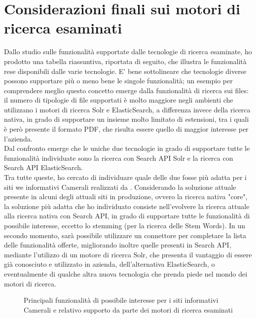 	\section{Considerazioni finali sui motori di ricerca esaminati}
	Dallo studio sulle funzionalità supportate dalle tecnologie di ricerca esaminate, ho prodotto una tabella riassuntiva, riportata di seguito, che illustra le funzionalità rese disponibili dalle varie tecnologie. E' bene sottolineare che tecnologie diverse possono supportare più o meno bene le singole funzionalità; un esempio per comprendere meglio questo concetto emerge dalla funzionalità di ricerca sui files: il numero di tipologie di file supportati è molto maggiore negli ambienti che utilizzano i motori di ricerca \gls{Solr} e \gls{ElasticSearch}, a differenza invece della ricerca nativa, in grado di supportare un insieme molto limitato di estensioni, tra i quali è però presente il formato PDF, che risulta essere quello di maggior interesse per l'azienda. \\
	Dal confronto emerge che le uniche due tecnologie in grado di supportare tutte le funzionalità individuate sono la ricerca con Search API Solr e la ricerca con Search API ElasticSearch. \\
	Tra tutte queste, ho cercato di individuare quale delle due fosse più adatta per i siti we informativi Camerali realizzati da \nomeAzienda. Considerando la soluzione attuale presente in alcuni degli attuali siti in produzione, ovvero la ricerca nativa "core", la soluzione più adatta che ho individuato consiste nell'evolvere la ricerca attuale alla ricerca nativa con Search API, in grado di supportare tutte le funzionalità di possibile interesse, eccetto lo stemming (per la ricerca delle \gls{Stem Words}). In un secondo momento, sarà possibile utilizzare un connettore per completare la lista delle funzionalità offerte, migliorando inoltre quelle presenti in Search API, mediante l'utilizzo di un motore di ricerca \gls{Solr}, che presenta il vantaggio di essere già conosciuto e utilizzato in azienda, dell'alternativa \gls{ElasticSearch}, o eventualmente di qualche altra nuova tecnologia che prenda piede nel mondo dei motori di ricerca.
	
	\begin{figure}[p]
		\caption{Principali funzionalità di possibile interesse per i siti informativi Camerali e relativo supporto da parte dei motori di ricerca esaminati}
	\end{figure}